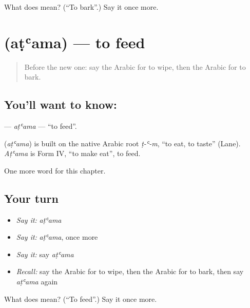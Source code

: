 \begin{tcolorbox}[breakable,colback=teal!4,colframe=teal!35!black,title={Before you move on}]
What does  mean? (\textquotedblleft{}To bark\textquotedblright{}.) Say it once more.
\end{tcolorbox}
\section[\texorpdfstring{\ar{أطعم} (aṭʿama)}{أطعم (aṭʿama)}]{ (aṭʿama) — to feed}

\label{lesson:AR-C230-atama}



\begin{quote}
Before the new one: say the Arabic for to wipe, then the Arabic for to bark.
\end{quote}

\subsection*{You'll want to know: }
\textbf{} — \emph{aṭʿama} — \textquotedblleft{}to feed\textquotedblright{}.

\begin{cousinweb}
\textbf{} (\emph{aṭʿama}) is built on the native Arabic root \emph{ṭ-ʿ-m}, \textquotedblleft{}to eat, to taste\textquotedblright{} (Lane). \emph{Aṭʿama} is Form IV, \textquotedblleft{}to make eat\textquotedblright{}, to feed.
\end{cousinweb}

\begin{grammarlens}[title={What you've built}]
One more word for this chapter.
\end{grammarlens}

\subsection*{Your turn}
\begin{itemize}
\raggedright
  \item \emph{Say it:} \emph{aṭʿama}
  \item \emph{Say it:} \emph{aṭʿama}, once more
  \item \emph{Say it:} say \emph{aṭʿama}
  \item \emph{Recall:} say the Arabic for to wipe, then the Arabic for to bark, then say \emph{aṭʿama} again
\end{itemize}

\begin{tcolorbox}[breakable,colback=teal!4,colframe=teal!35!black,title={Before you move on}]
What does  mean? (\textquotedblleft{}To feed\textquotedblright{}.) Say it once more.
\end{tcolorbox}
